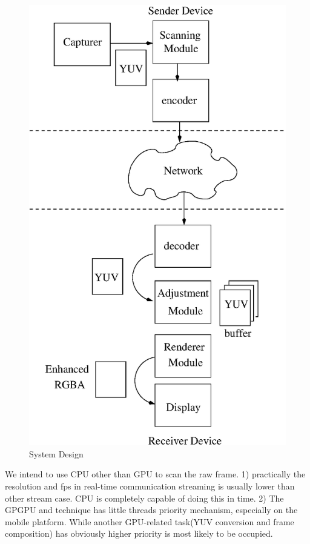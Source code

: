\begin{figure}
  \centering
\label{fig:design}
\includegraphics*[scale=0.5]{figures/design}
\caption{System Design}
\end{figure}

We intend to use CPU other than GPU to scan the raw frame. 1)
practically the resolution and fps in real-time communication
streaming is usually lower than other stream case. CPU is completely
capable of doing this in time. 2) The GPGPU and technique has little
threads priority mechanism, especially on the mobile platform. While
another GPU-related task(YUV conversion and frame composition) has
obviously higher priority is most likely to be occupied. 


